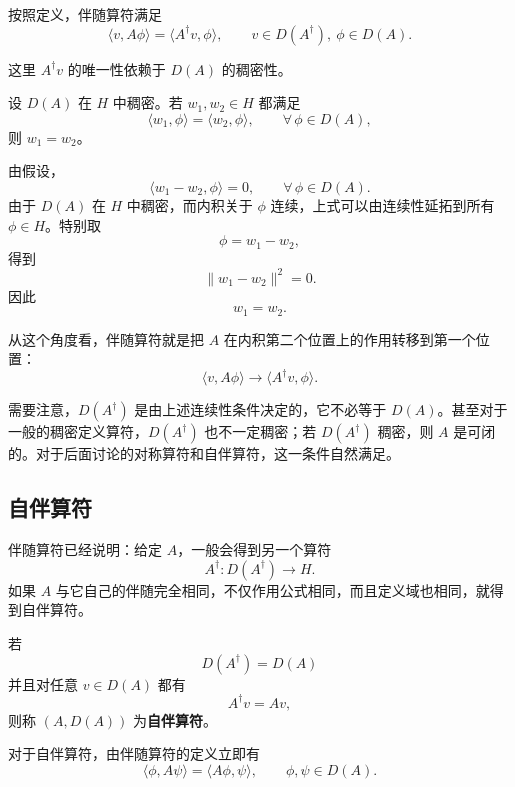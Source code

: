 \documentclass[UTF8,a4paper,11pt,openany]{ctexbook}
\begin{document}
按照定义，伴随算符满足
\begin{equation}
    \langle v,A\phi\rangle
    =
    \langle A^\dagger v,\phi\rangle,
    \qquad
    v\in D(A^\dagger),\ 
    \phi\in D(A).
\end{equation}

这里 $A^\dagger v$ 的唯一性依赖于 $D(A)$ 的稠密性。

\begin{proposition}[伴随向量的唯一性]
设 $D(A)$ 在 $H$ 中稠密。若 $w_1,w_2\in H$ 都满足
\[
\langle w_1,\phi\rangle
=
\langle w_2,\phi\rangle,
\qquad
\forall\,\phi\in D(A),
\]
则 $w_1=w_2$。
\end{proposition}

\begin{proofblock}
由假设，
\[
\langle w_1-w_2,\phi\rangle
=
0,
\qquad
\forall\,\phi\in D(A).
\]
由于 $D(A)$ 在 $H$ 中稠密，而内积关于 $\phi$ 连续，上式可以由连续性延拓到所有 $\phi\in H$。特别取
\[
\phi=w_1-w_2,
\]
得到
\[
\|w_1-w_2\|^2=0.
\]
因此
\[
w_1=w_2.
\]
\end{proofblock}

从这个角度看，伴随算符就是把 $A$ 在内积第二个位置上的作用转移到第一个位置：
\[
\langle v,A\phi\rangle
\longrightarrow
\langle A^\dagger v,\phi\rangle.
\]

需要注意，$D(A^\dagger)$ 是由上述连续性条件决定的，它不必等于 $D(A)$。甚至对于一般的稠密定义算符，$D(A^\dagger)$ 也不一定稠密；若 $D(A^\dagger)$ 稠密，则 $A$ 是可闭的。对于后面讨论的对称算符和自伴算符，这一条件自然满足。

\subsection{自伴算符}

伴随算符已经说明：给定 $A$，一般会得到另一个算符
\[
A^\dagger:D(A^\dagger)\to H.
\]
如果 $A$ 与它自己的伴随完全相同，不仅作用公式相同，而且定义域也相同，就得到自伴算符。

\begin{definition}[自伴算符]
若
\begin{equation}
    D(A^\dagger)=D(A)
\end{equation}
并且对任意 $v\in D(A)$ 都有
\begin{equation}
    A^\dagger v=Av,
\end{equation}
则称 $(A,D(A))$ 为\textbf{自伴算符}。
\end{definition}

对于自伴算符，由伴随算符的定义立即有
\begin{equation}
    \langle \phi,A\psi\rangle
    =
    \langle A\phi,\psi\rangle,
    \qquad
    \phi,\psi\in D(A).
\end{equation}
\end{document}
